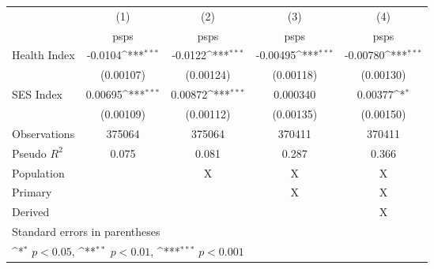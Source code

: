 {
\def\sym#1{\ifmmode^{#1}\else\(^{#1}\)\fi}
\begin{tabular}{l*{4}{c}}
\hline\hline
                    &\multicolumn{1}{c}{(1)}         &\multicolumn{1}{c}{(2)}         &\multicolumn{1}{c}{(3)}         &\multicolumn{1}{c}{(4)}         \\
                    &        psps         &        psps         &        psps         &        psps         \\
\hline
Health Index        &     -0.0104\sym{***}&     -0.0122\sym{***}&    -0.00495\sym{***}&    -0.00780\sym{***}\\
                    &   (0.00107)         &   (0.00124)         &   (0.00118)         &   (0.00130)         \\
[1em]
SES Index           &     0.00695\sym{***}&     0.00872\sym{***}&    0.000340         &     0.00377\sym{*}  \\
                    &   (0.00109)         &   (0.00112)         &   (0.00135)         &   (0.00150)         \\
\hline
Observations        &      375064         &      375064         &      370411         &      370411         \\
Pseudo \(R^{2}\)    &       0.075         &       0.081         &       0.287         &       0.366         \\
Population          &                     &           X         &           X         &           X         \\
Primary             &                     &                     &           X         &           X         \\
Derived             &                     &                     &                     &           X         \\
\hline\hline
\multicolumn{5}{l}{\footnotesize Standard errors in parentheses}\\
\multicolumn{5}{l}{\footnotesize \sym{*} \(p<0.05\), \sym{**} \(p<0.01\), \sym{***} \(p<0.001\)}\\
\end{tabular}
}
